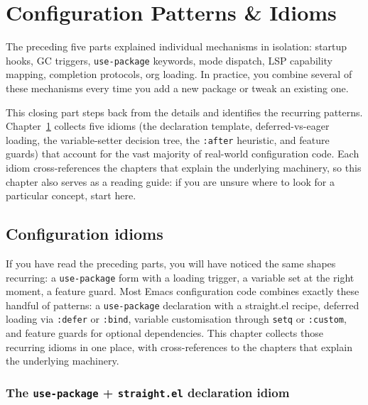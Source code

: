 \part{Configuration Patterns \& Idioms}
\label{part:idioms}

The preceding five parts explained individual mechanisms in
isolation: startup hooks, GC triggers, \texttt{use-package} keywords,
mode dispatch, LSP capability mapping, completion protocols, org
loading.  In practice, you combine several of these mechanisms every
time you add a new package or tweak an existing one.

This closing part steps back from the details and identifies the
recurring patterns.  Chapter~\ref{ch:configuration-idioms} collects
five idioms (the declaration template, deferred-vs-eager loading,
the variable-setter decision tree, the \texttt{:after} heuristic,
and feature guards) that account for the vast majority of real-world
configuration code.  Each idiom cross-references the chapters that
explain the underlying machinery, so this chapter also serves as a
reading guide: if you are unsure where to look for a particular
concept, start here.

\chapter{Configuration idioms}
\label{ch:configuration-idioms}
\minitoc
{}

If you have read the preceding parts, you will have noticed the same
shapes recurring: a \texttt{use-package} form with a loading trigger,
a variable set at the right moment, a feature guard.  Most Emacs
configuration code combines exactly these handful of patterns:
a \texttt{use-package} declaration with a straight.el recipe, deferred
loading via \texttt{:defer} or \texttt{:bind}, variable customisation
through \texttt{setq} or \texttt{:custom}, and feature guards for
optional dependencies.  This chapter collects those recurring idioms
in one place, with cross-references to the chapters that explain the
underlying machinery.

\section{The \texttt{use-package} + \texttt{straight.el} declaration idiom}

